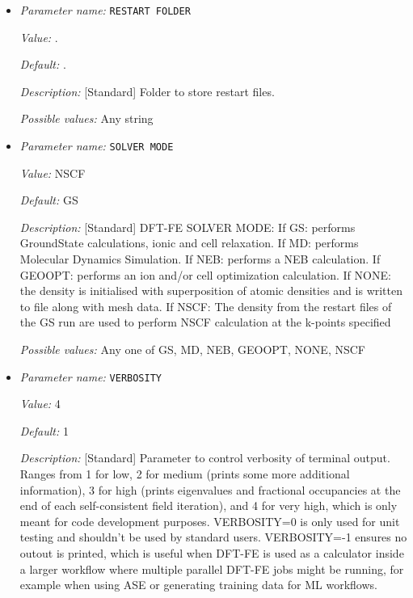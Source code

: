 \begin{itemize}
{\it Default:} false


{\it Description:} [Standard] If set to true RESTART triggers restart checks and modifies the input files for coordinates, domain vectors. Default: false.


{\it Possible values:} A boolean value (true or false)
\item {\it Parameter name:} {\tt RESTART FOLDER}
\label{parameters:RESTART FOLDER}
\label{parameters:RESTART_20FOLDER}


{\it Value:} .


{\it Default:} .


{\it Description:} [Standard] Folder to store restart files.


{\it Possible values:} Any string
\item {\it Parameter name:} {\tt SOLVER MODE}
\label{parameters:SOLVER MODE}
\label{parameters:SOLVER_20MODE}


{\it Value:} NSCF


{\it Default:} GS


{\it Description:} [Standard] DFT-FE SOLVER MODE: If GS: performs GroundState calculations, ionic and cell relaxation. If MD: performs Molecular Dynamics Simulation. If NEB: performs a NEB calculation. If GEOOPT: performs an ion and/or cell optimization calculation. If NONE: the density is initialised with superposition of atomic densities and is written to file along with mesh data. If NSCF: The density from the restart files of the GS run are used to perform NSCF calculation at the k-points specified


{\it Possible values:} Any one of GS, MD, NEB, GEOOPT, NONE, NSCF
\item {\it Parameter name:} {\tt VERBOSITY}
\label{parameters:VERBOSITY}


{\it Value:} 4


{\it Default:} 1


{\it Description:} [Standard] Parameter to control verbosity of terminal output. Ranges from 1 for low, 2 for medium (prints some more additional information), 3 for high (prints eigenvalues and fractional occupancies at the end of each self-consistent field iteration), and 4 for very high, which is only meant for code development purposes. VERBOSITY=0 is only used for unit testing and shouldn't be used by standard users. VERBOSITY=-1 ensures no outout is printed, which is useful when DFT-FE is used as a calculator inside a larger workflow where multiple parallel DFT-FE jobs might be running, for example when using ASE or generating training data for ML workflows.



\end{itemize}
